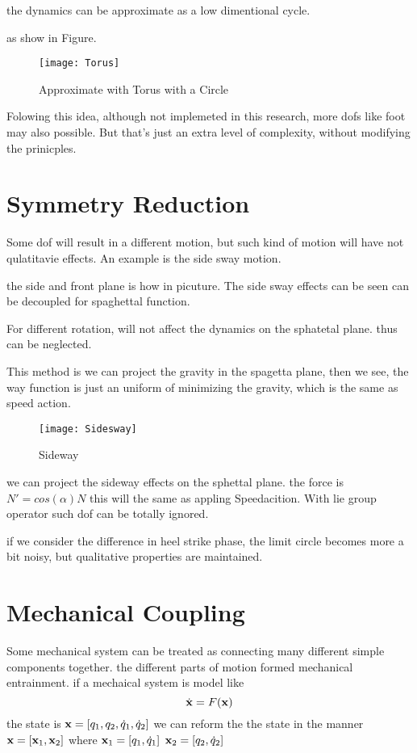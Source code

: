 the dynamics can be approximate as a low dimentional cycle.

as show in Figure.

\begin{figure}[!htbp]
  \begin{center}
      \texttt{[image: Torus]}
    \caption{Approximate with Torus with a Circle}
    \label{fig:approximate}
\end{center}
\end{figure}


Folowing this idea, although not implemeted in this research, more dofs like foot may also possible.
But that's just an extra level of complexity, without modifying the prinicples. 
\section{Symmetry Reduction}
Some dof will result in a different motion, but such kind of motion will have not qulatitavie effects.
An example is the side sway motion.

the side and front plane is how in picuture.
The side sway effects can be seen can be decoupled for spaghettal function.


For different rotation, will not affect the dynamics on the sphatetal plane.
thus can be neglected.

This method is we can project the gravity in the spagetta plane,
then we see, the way function is just an uniform of minimizing the gravity,
which is the same as speed action.

\begin{figure}[!htbp]
  \begin{center}
      \texttt{[image: Sidesway]}
    \caption{Sideway}
    \label{fig:sidesway}
\end{center}
\end{figure}


we can project the sideway effects on the sphettal plane. the force is $N'=cos(\alpha)N$
this will the same as appling Speedacition.
With lie group operator such dof can be totally ignored.


if we consider the difference in heel strike phase,
the limit circle becomes more a bit noisy, but qualitative properties are maintained.

\section{Mechanical Coupling}
Some mechanical system can be treated as connecting many different simple components together.
the different parts of motion formed mechanical entrainment.
if a mechaical system is model like
\[
\dot{\mathbf{x}}=F(\mathbf{x})
\]
the state is $\mathbf{x}=[q_1,q_2,\dot{q}_1,\dot{q}_2]$
we can reform the the state in the manner
$\mathbf{x}=[\mathbf{x}_1,\mathbf{x}_2]$
where
$\mathbf{x}_1=[q_1,\dot{q}_1]$
$\mathbf{x}_2=[q_2,\dot{q}_2]$

